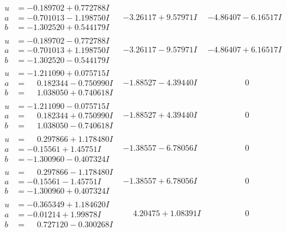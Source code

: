 \documentclass[1p]{elsarticle_modified}
\theoremstyle{definition}
\begin{document}
$$\begin{array}{c|c|c}
\begin{aligned}
u &= -0.189702 + 0.772788 I \\
a &= -0.701013 - 1.198750 I \\
b &= -1.302520 + 0.544179 I\end{aligned}
 & -3.26117 + 9.57971 I & -4.86407 - 6.16517 I \\ \hline\begin{aligned}
u &= -0.189702 - 0.772788 I \\
a &= -0.701013 + 1.198750 I \\
b &= -1.302520 - 0.544179 I\end{aligned}
 & -3.26117 - 9.57971 I & -4.86407 + 6.16517 I \\ \hline\begin{aligned}
u &= -1.211090 + 0.075715 I \\
a &= \phantom{-}0.182344 - 0.750990 I \\
b &= \phantom{-}1.038050 + 0.740618 I\end{aligned}
 & -1.88527 - 4.39440 I & \phantom{-0.000000 } 0 \\ \hline\begin{aligned}
u &= -1.211090 - 0.075715 I \\
a &= \phantom{-}0.182344 + 0.750990 I \\
b &= \phantom{-}1.038050 - 0.740618 I\end{aligned}
 & -1.88527 + 4.39440 I & \phantom{-0.000000 } 0 \\ \hline\begin{aligned}
u &= \phantom{-}0.297866 + 1.178480 I \\
a &= -0.15561 + 1.45751 I \\
b &= -1.300960 - 0.407324 I\end{aligned}
 & -1.38557 - 6.78056 I & \phantom{-0.000000 } 0 \\ \hline\begin{aligned}
u &= \phantom{-}0.297866 - 1.178480 I \\
a &= -0.15561 - 1.45751 I \\
b &= -1.300960 + 0.407324 I\end{aligned}
 & -1.38557 + 6.78056 I & \phantom{-0.000000 } 0 \\ \hline\begin{aligned}
u &= -0.365349 + 1.184620 I \\
a &= -0.01214 + 1.99878 I \\
b &= \phantom{-}0.727120 - 0.300268 I\end{aligned}
 & \phantom{-}4.20475 + 1.08391 I & \phantom{-0.000000 } 0 \\ \hline\begin{aligned}

\end{aligned}
\end{array}$$
\end{document}

